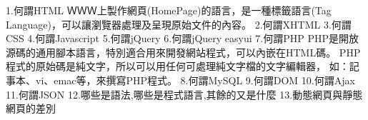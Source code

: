 1.何謂HTML
ＷＷＷ上製作網頁(HomePage)的語言，是一種標籤語言(Tag Language)，可以讓瀏覽器處理及呈現原始文件的內容。
2.何謂XHTML
3.何謂CSS
4.何謂Javascript
5.何謂jQuery
6.何謂jQuery easyui
7.何謂PHP
PHP是開放源碼的通用腳本語言，特別適合用來開發網站程式，可以內嵌在HTML碼。
PHP程式的原始碼是純文字，所以可以用任何可處理純文字檔的文字編輯器，
如：記事本、vi、emac等，來撰寫PHP程式。
8.何謂MySQL
9.何謂DOM
10.何謂Ajax
11.何謂JSON
12.哪些是語法,哪些是程式語言,其餘的又是什麼
13.動態網頁與靜態網頁的差別

